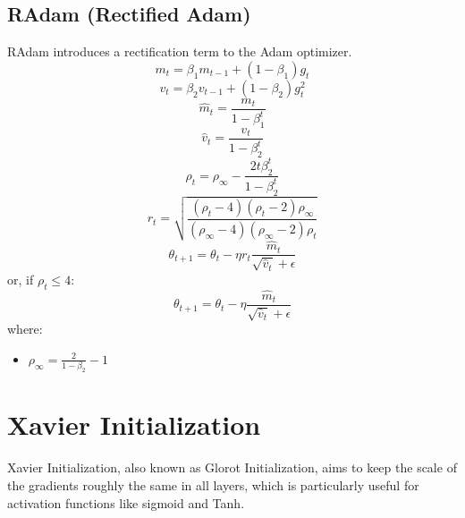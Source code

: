 \documentclass{article}
\begin{document}
\subsection{RAdam (Rectified Adam)}
RAdam introduces a rectification term to the Adam optimizer.
\begin{equation}
m_t = \beta_1 m_{t-1} + (1 - \beta_1) g_t
\end{equation}
\begin{equation}
v_t = \beta_2 v_{t-1} + (1 - \beta_2) g_t^2
\end{equation}
\begin{equation}
\hat{m}_t = \frac{m_t}{1 - \beta_1^t}
\end{equation}
\begin{equation}
\hat{v}_t = \frac{v_t}{1 - \beta_2^t}
\end{equation}
\begin{equation}
\rho_t = \rho_{\infty} - \frac{2t\beta_2^t}{1 - \beta_2^t}
\end{equation}
\begin{equation}
r_t = \sqrt{\frac{(\rho_t - 4)(\rho_t - 2)\rho_{\infty}}{(\rho_{\infty} - 4)(\rho_{\infty} - 2)\rho_t}}
\end{equation}
\begin{equation}
\theta_{t+1} = \theta_t - \eta r_t \frac{\hat{m}_t}{\sqrt{\hat{v}_t} + \epsilon}
\end{equation}
or, if \( \rho_t \leq 4 \):
\begin{equation}
\theta_{t+1} = \theta_t - \eta \frac{\hat{m}_t}{\sqrt{\hat{v}_t} + \epsilon}
\end{equation}
where:
\begin{itemize}
    \item $\rho_{\infty} = \frac{2}{1 - \beta_2} - 1$
\end{itemize}











\section{Xavier Initialization}

Xavier Initialization, also known as Glorot Initialization, aims to keep the scale of the gradients roughly the same in all layers, which is particularly useful for activation functions like sigmoid and Tanh.
\end{document}
